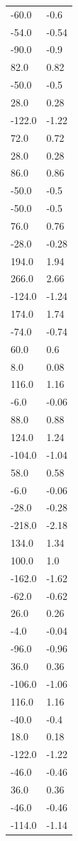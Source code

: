 \begin{longtable}{ll}
-60.0 & -0.6 \\
-54.0 & -0.54 \\
-90.0 & -0.9 \\
82.0 & 0.82 \\
-50.0 & -0.5 \\
28.0 & 0.28 \\
-122.0 & -1.22 \\
72.0 & 0.72 \\
28.0 & 0.28 \\
86.0 & 0.86 \\
-50.0 & -0.5 \\
-50.0 & -0.5 \\
76.0 & 0.76 \\
-28.0 & -0.28 \\
194.0 & 1.94 \\
266.0 & 2.66 \\
-124.0 & -1.24 \\
174.0 & 1.74 \\
-74.0 & -0.74 \\
60.0 & 0.6 \\
8.0 & 0.08 \\
116.0 & 1.16 \\
-6.0 & -0.06 \\
88.0 & 0.88 \\
124.0 & 1.24 \\
-104.0 & -1.04 \\
58.0 & 0.58 \\
-6.0 & -0.06 \\
-28.0 & -0.28 \\
-218.0 & -2.18 \\
134.0 & 1.34 \\
100.0 & 1.0 \\
-162.0 & -1.62 \\
-62.0 & -0.62 \\
26.0 & 0.26 \\
-4.0 & -0.04 \\
-96.0 & -0.96 \\
36.0 & 0.36 \\
-106.0 & -1.06 \\
116.0 & 1.16 \\
-40.0 & -0.4 \\
18.0 & 0.18 \\
-122.0 & -1.22 \\
-46.0 & -0.46 \\
36.0 & 0.36 \\
-46.0 & -0.46 \\
-114.0 & -1.14 \\

\end{longtable}
